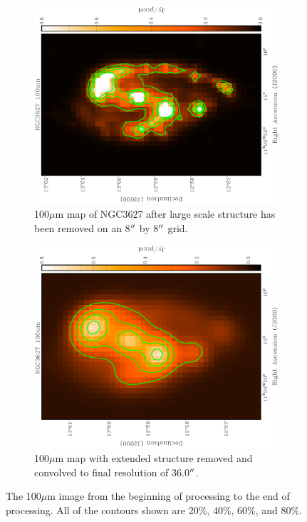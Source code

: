 \begin{figure}
  \begin{subfigure}[t]{.45\textwidth}
    \centering
    \includegraphics[width=1.\textwidth,angle=270]{obs_imgs/100_um.eps}
    \caption{100$\mu$m map of NGC3627 after large scale structure has been removed on an 8$\mbox{$^{\prime\prime}$}$ by 8$\mbox{$^{\prime\prime}$}$ grid.}
  \end{subfigure}%
  \quad
  \begin{subfigure}[t]{0.45\textwidth}
    \centering
    \includegraphics[width=1.\textwidth,angle=270]{obs_imgs/100um_conv.eps}
    \caption[100$\mu$m Filtering Steps]{100$\mu$m map with extended structure removed and convolved to final resolution of 36.0$\mbox{$^{\prime\prime}$}$.}
  \end{subfigure}
  \caption[100$\mu$m Filtering Steps]{The 100$\mu$m image from the beginning of processing to the end of processing.  All of the contours shown are 20\%, 40\%, 60\%, and 80\%.}
  \label{fig_100_transform}
\end{figure}
  

